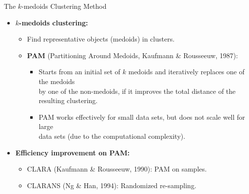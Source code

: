 \begin{frame}{The $k$-medoids Clustering Method}
	\begin{itemize}
		\item \textbf{$k$-medoids clustering:}
		\begin{itemize}
			\item Find representative objects (medoids) in clusters.
			\item \textbf{PAM} (Partitioning Around Medoids, Kaufmann \& 
			Rousseeuw, 1987):
			\begin{itemize}
				\item Starts from an initial set of $k$ medoids and iteratively 
				replaces one of the medoids \\
				by one of the non-medoids, if it improves the total distance of 
				the resulting clustering.
				\item PAM works effectively for small data sets, but does not 
				scale well for large\\
				data sets (due to the computational complexity).
			\end{itemize}
		\end{itemize}
		\item \textbf{Efficiency improvement on PAM:}
		\begin{itemize}
			\item CLARA (Kaufmann \& Rousseeuw, 1990): PAM on samples.
			\item CLARANS (Ng \& Han, 1994): Randomized re-sampling.
		\end{itemize}
	\end{itemize}
\end{frame}

